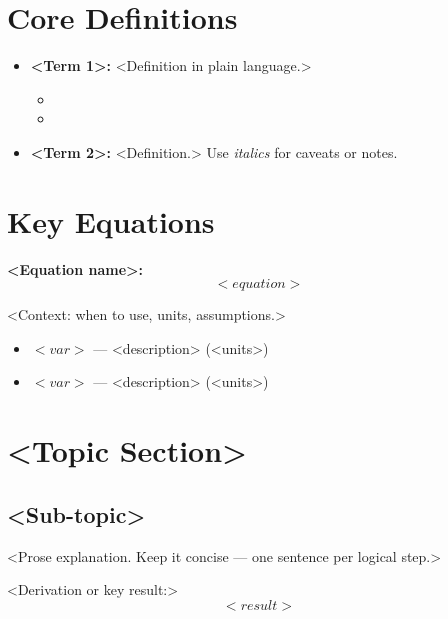 \documentclass[11pt,a4paper]{article}
\begin{document}
\section*{Core Definitions}

\begin{itemize}[leftmargin=1.5em, itemsep=2pt]
  \item \textbf{<Term 1>:}
    <Definition in plain language.>
    \begin{itemize}[leftmargin=1em, itemsep=1pt]
      \item <Sub-point, example, or clarification>
      \item <Sub-point, example, or clarification>
    \end{itemize}

  \item \textbf{<Term 2>:}
    <Definition.> Use \textit{italics} for caveats or notes.
\end{itemize}

\section*{Key Equations}

\textbf{<Equation name>:}
\[
  \boxed{<equation>}
\]

<Context: when to use, units, assumptions.>

\begin{itemize}[leftmargin=1.5em, itemsep=2pt]
  \item $<var>$ --- <description> (<units>)
  \item $<var>$ --- <description> (<units>)
\end{itemize}

\section*{<Topic Section>}

\subsection*{<Sub-topic>}

<Prose explanation. Keep it concise --- one sentence per logical step.>

<Derivation or key result:>
\[
  \boxed{<result>}
\]
\end{document}
